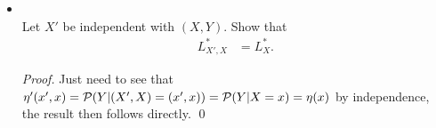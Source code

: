 \documentclass[11pt]{article}
\begin{document}
\begin{itemize}
\item \begin{exercise}\citep{devroye2013probabilistic}\\
Let $X'$ be independent with $(X,Y)$. Show that 
\begin{align*}
L_{X', X}^{*} &= L_{X}^{*}.
\end{align*}
\end{exercise}
\begin{proof}
Just need to see that $\eta'(x',x) = {\mathcal P}(Y| (X', X)= (x' , x)) = {\mathcal P}(Y| X=x)= \eta(x)$ by independence, the result then follows directly. \qed
\end{proof}




\end{itemize}
\end{document}
